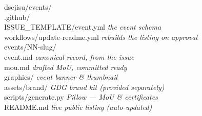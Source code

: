 \documentclass[11pt,a4paper]{article}
\begin{document}
\begin{tcolorbox}[enhanced,colback=Mist,colframe=Line,boxrule=0.6pt,arc=4pt,
    left=14pt,right=14pt,top=10pt,bottom=10pt]
{\footnotesize\ttfamily\color{Ink}%
dscjisu/events/\\
\hspace*{1em}.github/\\
\hspace*{2.2em}ISSUE\_TEMPLATE/event.yml \hfill {\rmfamily\itshape\color{Slate}the event schema}\\
\hspace*{2.2em}workflows/update-readme.yml \hfill {\rmfamily\itshape\color{Slate}rebuilds the listing on approval}\\
\hspace*{1em}events/NN-slug/\\
\hspace*{2.2em}event.md \hfill {\rmfamily\itshape\color{Slate}canonical record, from the issue}\\
\hspace*{2.2em}mou.md \hfill {\rmfamily\itshape\color{Slate}drafted MoU, committed ready}\\
\hspace*{2.2em}graphics/ \hfill {\rmfamily\itshape\color{Slate}event banner \& thumbnail}\\
\hspace*{1em}assets/brand/ \hfill {\rmfamily\itshape\color{Slate}GDG brand kit (provided separately)}\\
\hspace*{1em}scripts/generate.py \hfill {\rmfamily\itshape\color{Slate}Pillow — MoU \& certificates}\\
\hspace*{1em}README.md \hfill {\rmfamily\itshape\color{Slate}live public listing (auto-updated)}%
}
\end{tcolorbox}
\end{document}
